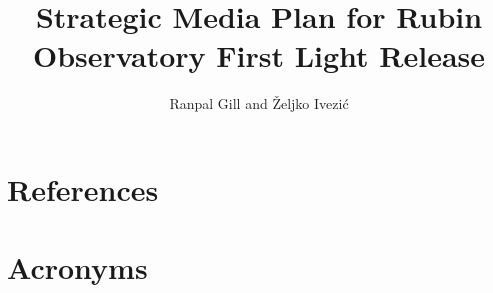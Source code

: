 \documentclass[OPS,lsstdraft,authoryear,toc]{lsstdoc}
\title{Strategic Media Plan for Rubin Observatory First Light Release}
\author{%
Ranpal Gill and
\v{Z}eljko Ivezi\'{c}
}
\date{\vcsDate}
\begin{document}
\maketitle


\appendix

\section{References} \label{sec:bib}
\renewcommand{\refname}{} %


\section{Acronyms} \label{sec:acronyms}

\end{document}
